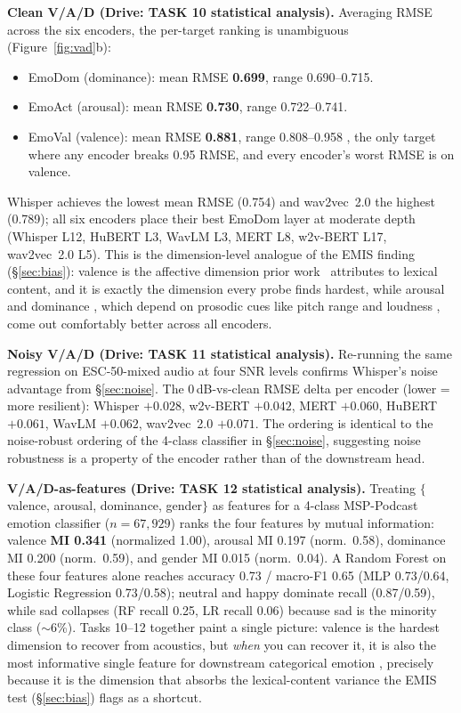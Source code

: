 \documentclass[sigconf,screen]{acmart}
\begin{document}
\textbf{Clean V/A/D (Drive: TASK 10 statistical analysis).} Averaging RMSE across the six encoders, the per-target ranking is unambiguous (Figure~\ref{fig:vad}b):
\begin{itemize}
  \item EmoDom (dominance): mean RMSE \textbf{0.699}, range 0.690--0.715.
  \item EmoAct (arousal): mean RMSE \textbf{0.730}, range 0.722--0.741.
  \item EmoVal (valence): mean RMSE \textbf{0.881}, range 0.808--0.958 , the only target where any encoder breaks 0.95 RMSE, and every encoder's worst RMSE is on valence.
\end{itemize}
Whisper achieves the lowest mean RMSE (0.754) and wav2vec~2.0 the highest (0.789); all six encoders place their best EmoDom layer at moderate depth (Whisper L12, HuBERT L3, WavLM L3, MERT L8, w2v-BERT L17, wav2vec~2.0 L5). This is the dimension-level analogue of the EMIS finding (\S\ref{sec:bias}): valence is the affective dimension prior work~\cite{wagner2023dawn,triantafyllopoulos2022probing} attributes to lexical content, and it is exactly the dimension every probe finds hardest, while arousal and dominance , which depend on prosodic cues like pitch range and loudness , come out comfortably better across all encoders.

\textbf{Noisy V/A/D (Drive: TASK 11 statistical analysis).} Re-running the same regression on ESC-50-mixed audio at four SNR levels confirms Whisper's noise advantage from \S\ref{sec:noise}. The 0\,dB-vs-clean RMSE delta per encoder (lower = more resilient): Whisper $+0.028$, w2v-BERT $+0.042$, MERT $+0.060$, HuBERT $+0.061$, WavLM $+0.062$, wav2vec~2.0 $+0.071$. The ordering is identical to the noise-robust ordering of the 4-class classifier in \S\ref{sec:noise}, suggesting noise robustness is a property of the encoder rather than of the downstream head.

\textbf{V/A/D-as-features (Drive: TASK 12 statistical analysis).} Treating $\{$valence, arousal, dominance, gender$\}$ as features for a 4-class MSP-Podcast emotion classifier ($n{=}67{,}929$) ranks the four features by mutual information: valence \textbf{MI 0.341} (normalized 1.00), arousal MI 0.197 (norm.\ 0.58), dominance MI 0.200 (norm.\ 0.59), and gender MI 0.015 (norm.\ 0.04). A Random Forest on these four features alone reaches accuracy 0.73 / macro-F1 0.65 (MLP 0.73/0.64, Logistic Regression 0.73/0.58); neutral and happy dominate recall (0.87/0.59), while sad collapses (RF recall 0.25, LR recall 0.06) because sad is the minority class ($\sim$6\%). Tasks 10--12 together paint a single picture: valence is the hardest dimension to recover from acoustics, but \emph{when} you can recover it, it is also the most informative single feature for downstream categorical emotion , precisely because it is the dimension that absorbs the lexical-content variance the EMIS test (\S\ref{sec:bias}) flags as a shortcut.
\end{document}
